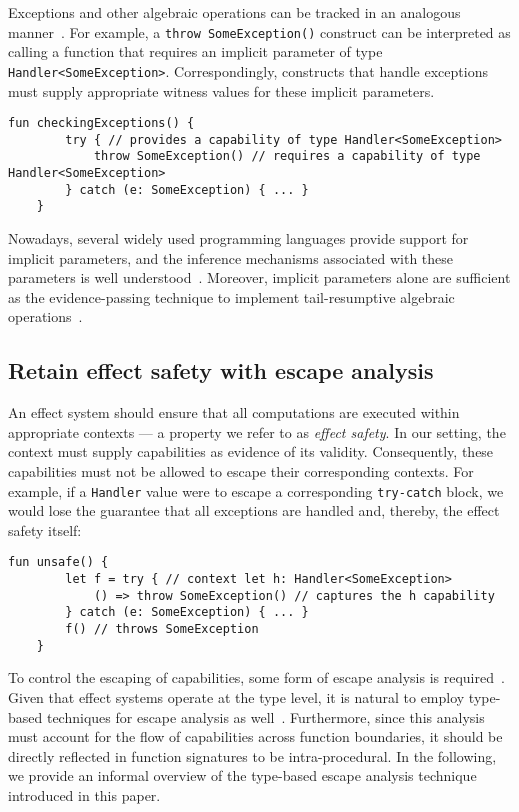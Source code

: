\documentclass[acmsmall,review,screen]{acmart}
\begin{document}
Exceptions and other algebraic operations can be tracked in an analogous manner~\cite{odersky2021safer}.
For example, a \lstinline[language=colang]|throw SomeException()| construct can be interpreted as calling a function that requires an implicit parameter of type \lstinline[language=colang]|Handler<SomeException>|.
Correspondingly, constructs that handle exceptions must supply appropriate witness values for these implicit parameters.
\begin{lstlisting}[language=colang]
    fun checkingExceptions() {
        try { // provides a capability of type Handler<SomeException>
            throw SomeException() // requires a capability of type Handler<SomeException>
        } catch (e: SomeException) { ... }
    }
\end{lstlisting}

Nowadays, several widely used programming languages provide support for implicit parameters, and the inference mechanisms associated with these parameters is well understood~\cite{KEEP-context-parameters, oliveira2010type, lewis2000implicit}.
Moreover, implicit parameters alone are sufficient as the evidence-passing technique to implement tail-resumptive algebraic operations~\cite{xie2020effect}.

\subsection{Retain effect safety with escape analysis} \label{subsec:escape}

An effect system should ensure that all computations are executed within appropriate contexts --- a property we refer to as \textit{effect safety}.
In our setting, the context must supply capabilities as evidence of its validity.
Consequently, these capabilities must not be allowed to escape their corresponding contexts.
For example, if a \lstinline[language=colang]|Handler| value were to escape a corresponding \lstinline[language=colang]|try-catch| block, we would lose the guarantee that all exceptions are handled and, thereby, the effect safety itself:
\begin{lstlisting}[language=colang]
    fun unsafe() {
        let f = try { // context let h: Handler<SomeException>
            () => throw SomeException() // captures the h capability
        } catch (e: SomeException) { ... }
        f() // throws SomeException
    }
\end{lstlisting}

To control the escaping of capabilities, some form of escape analysis is required~\cite{park1992escape}.
Given that effect systems operate at the type level, it is natural to employ type-based techniques for escape analysis as well~\cite{xie2022first}.
Furthermore, since this analysis must account for the flow of capabilities across function boundaries, it should be directly reflected in function signatures to be intra-procedural.
In the following, we provide an informal overview of the type-based escape analysis technique introduced in this paper.
\end{document}
